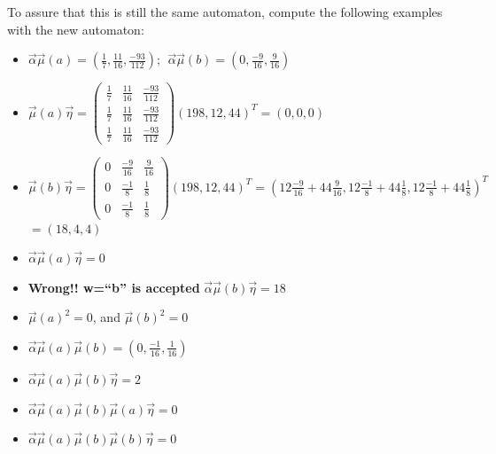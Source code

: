        
        To assure that this is still the same automaton, compute the following examples with the new automaton:
        \begin{itemize}
            \item $\overrightarrow{\alpha} \overrightarrow{\mu}(a) = (\frac{1}{7}, \frac{11}{16}, \frac{-93}{112}); \ \ \overrightarrow{\alpha} \overrightarrow{\mu}(b) = (0, \frac{-9}{16}, \frac{9}{16})$
            
            \item $ \overrightarrow{\mu}(a) \overrightarrow{\eta} = \begin{pmatrix}
                \frac{1}{7} & \frac{11}{16} & \frac{-93}{112} \\
                \frac{1}{7} & \frac{11}{16} & \frac{-93}{112} \\
                \frac{1}{7} & \frac{11}{16} & \frac{-93}{112}
            \end{pmatrix}  (198, 12, 44)^T = (0,0,0)$
            
            \item $ \overrightarrow{\mu}(b) \overrightarrow{\eta} = \begin{pmatrix}
                0 & \frac{-9}{16} & \frac{9}{16} \\
                0 & \frac{-1}{8} & \frac{1}{8} \\
                0 & \frac{-1}{8} & \frac{1}{8} 
            \end{pmatrix} (198, 12, 44)^T = (12 \frac{-9}{16} + 44 \frac{9}{16}, 12\frac{-1}{8} + 44\frac{1}{8}, 12\frac{-1}{8} + 44\frac{1}{8})^T$ \\
            $= (18, 4, 4)$
            
            \item $\overrightarrow{\alpha} \overrightarrow{\mu}(a) \overrightarrow{\eta} = 0$
            \item \textbf{Wrong!! w=``b'' is accepted} $\overrightarrow{\alpha} \overrightarrow{\mu}(b) \overrightarrow{\eta} = 18$
                
            \item $\overrightarrow{\mu}(a)^2 = 0$, and $\overrightarrow{\mu}(b)^2 = 0$
                
            \item $\overrightarrow{\alpha} \overrightarrow{\mu}(a) \overrightarrow{\mu}(b) =  ( 0, \frac{-1}{16}, \frac{1}{16})$
                
            \item $\overrightarrow{\alpha} \overrightarrow{\mu}(a) \overrightarrow{\mu}(b) \overrightarrow{\eta} = 2$
            
            \item $\overrightarrow{\alpha} \overrightarrow{\mu}(a) \overrightarrow{\mu}(b) \overrightarrow{\mu}(a) \overrightarrow{\eta} = 0$
            
            \item $\overrightarrow{\alpha} \overrightarrow{\mu}(a) \overrightarrow{\mu}(b) \overrightarrow{\mu}(b) \overrightarrow{\eta} = 0$
        \end{itemize}
            
